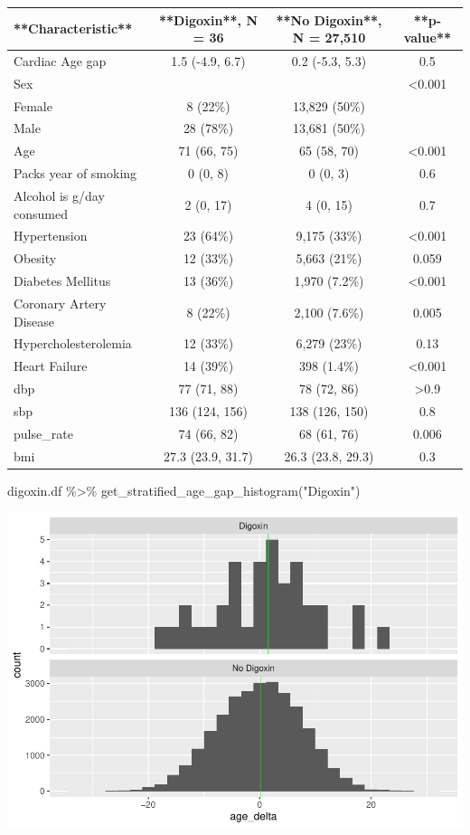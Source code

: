 \documentclass[
]{article}
\newenvironment{Shaded}{\begin{snugshade}}{\end{snugshade}}
\newcommand{\FunctionTok}[1]{\textcolor[rgb]{0.00,0.00,0.00}{#1}}
\newcommand{\NormalTok}[1]{#1}
\newcommand{\SpecialCharTok}[1]{\textcolor[rgb]{0.00,0.00,0.00}{#1}}
\newcommand{\StringTok}[1]{\textcolor[rgb]{0.31,0.60,0.02}{#1}}
\begin{document}
\begin{tabular}{l|c|c|c}
\hline
**Characteristic** & **Digoxin**, N = 36 & **No Digoxin**, N = 27,510 & **p-value**\\
\hline
Cardiac Age gap & 1.5 (-4.9, 6.7) & 0.2 (-5.3, 5.3) & 0.5\\
\hline
Sex &  &  & <0.001\\
\hline
Female & 8 (22\%) & 13,829 (50\%) & \\
\hline
Male & 28 (78\%) & 13,681 (50\%) & \\
\hline
Age & 71 (66, 75) & 65 (58, 70) & <0.001\\
\hline
Packs year of smoking & 0 (0, 8) & 0 (0, 3) & 0.6\\
\hline
Alcohol is g/day consumed & 2 (0, 17) & 4 (0, 15) & 0.7\\
\hline
Hypertension & 23 (64\%) & 9,175 (33\%) & <0.001\\
\hline
Obesity & 12 (33\%) & 5,663 (21\%) & 0.059\\
\hline
Diabetes Mellitus & 13 (36\%) & 1,970 (7.2\%) & <0.001\\
\hline
Coronary Artery Disease & 8 (22\%) & 2,100 (7.6\%) & 0.005\\
\hline
Hypercholesterolemia & 12 (33\%) & 6,279 (23\%) & 0.13\\
\hline
Heart Failure & 14 (39\%) & 398 (1.4\%) & <0.001\\
\hline
dbp & 77 (71, 88) & 78 (72, 86) & >0.9\\
\hline
sbp & 136 (124, 156) & 138 (126, 150) & 0.8\\
\hline
pulse\_rate & 74 (66, 82) & 68 (61, 76) & 0.006\\
\hline
bmi & 27.3 (23.9, 31.7) & 26.3 (23.8, 29.3) & 0.3\\
\hline
\end{tabular}

\begin{Shaded}
\begin{Highlighting}[]
\NormalTok{digoxin.df }\SpecialCharTok{\%\textgreater{}\%} 
  \FunctionTok{get\_stratified\_age\_gap\_histogram}\NormalTok{(}\StringTok{"Digoxin"}\NormalTok{)}
\end{Highlighting}
\end{Shaded}

\includegraphics{../results/report_files/figure-latex/digoxin-age-gap-histograms-1.pdf}
\end{document}
